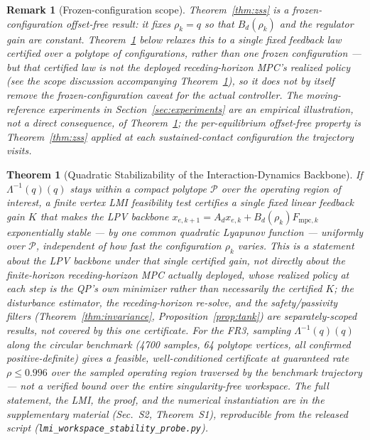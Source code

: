\documentclass[journal]{IEEEtran}
\newtheorem{theorem}{Theorem}
\newtheorem{remark}{Remark}
\newcommand{\Laminv}{\Lambda^{-1}(q)}
\newcommand{\Fmpck}[1]{F_{\text{mpc},#1}}
\begin{document}
\begin{remark}[Frozen-configuration scope]
Theorem~\ref{thm:zss} is a \emph{frozen-configuration} offset-free result:
it fixes $\rho_k=q$ so that $B_d(\rho_k)$ and the regulator gain are
constant. Theorem~\ref{thm:workspace} below relaxes this to a single
\emph{fixed feedback law} certified over a polytope of configurations,
rather than one frozen configuration --- but that certified law is not the
deployed receding-horizon MPC's realized policy (see the scope discussion
accompanying Theorem~\ref{thm:workspace}), so it does not by itself
remove the frozen-configuration caveat for the actual controller. The
moving-reference experiments in Section~\ref{sec:experiments} are an
empirical illustration, not a direct consequence, of
Theorem~\ref{thm:workspace}; the per-equilibrium offset-free property is
Theorem~\ref{thm:zss} applied at each sustained-contact configuration the
trajectory visits.
\end{remark}

\begin{theorem}[Quadratic Stabilizability of the Interaction-Dynamics Backbone]\label{thm:workspace}
If $\Laminv(q)$ stays within a compact polytope $\mathcal P$ over the
operating region of interest, a finite vertex LMI feasibility test
certifies a \emph{single} fixed linear feedback gain $K$ that makes the
LPV backbone $x_{e,k+1}=A_dx_{e,k}+B_d(\rho_k)\Fmpck{k}$ exponentially
stable --- by one common quadratic Lyapunov function --- uniformly over
$\mathcal P$, independent of how fast the configuration $\rho_k$ varies.
This is a statement about the LPV \emph{backbone} under that single
certified gain, not directly about the finite-horizon receding-horizon
MPC actually deployed, whose realized policy at each step is the QP's
own minimizer rather than necessarily the certified $K$; the disturbance
estimator, the receding-horizon re-solve, and the safety/passivity
filters (Theorem~\ref{thm:invariance}, Proposition~\ref{prop:tank}) are
separately-scoped results, not covered by this one certificate. For the
FR3, sampling $\Laminv(q)$ along the circular benchmark (4700 samples,
64 polytope vertices, all confirmed positive-definite) gives a feasible,
well-conditioned certificate at guaranteed rate $\rho\le0.996$ over the
\emph{sampled operating region traversed by the benchmark trajectory}
--- not a verified bound over the entire singularity-free workspace. The
full statement, the LMI, the proof, and the numerical instantiation are
in the supplementary material (Sec.~S2, Theorem~S1), reproducible from
the released script (\texttt{lmi\_workspace\_stability\_probe.py}).
\end{theorem}
\end{document}
